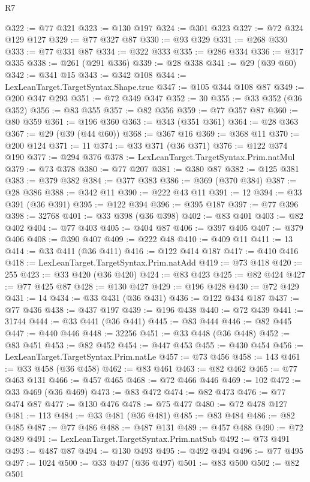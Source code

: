 \begin{lexlean}{R7}
\begin{coremodule}
@322 := @77 @321
@323 := @130 @197
@324 := @301 @323
@327 := @72 @324 @129 @127
@329 := @77 @327 @87
@330 := @93 @329
@331 := @268 @330
@333 := @77 @331 @87
@334 := @322 @333
@335 := @286 @334
@336 := @317 @335
@338 := @261 (@291 @336)
@339 := @28 @338
@341 := @29 (@39 @60)
@342 := @341 @15
@343 := @342 @108
@344 := LexLeanTarget.TargetSyntax.Shape.true
@347 := @105 @344 @108 @87
@349 := @200 @347 @293
@351 := @72 @349 @347
@352 := 30
@355 := @33 @352 (@36 @352)
@356 := @83 @355
@357 := @82 @356
@359 := @77 @357 @87
@360 := @80 @359
@361 := @196 @360
@363 := @343 (@351 @361)
@364 := @28 @363
@367 := @29 (@39 (@44 @60))
@368 := @367 @16
@369 := @368 @11
@370 := @200 @124
@371 := 11
@374 := @33 @371 (@36 @371)
@376 := @122 @374 @190
@377 := @294 @376
@378 := LexLeanTarget.TargetSyntax.Prim.natMul
@379 := @73 @378
@380 := @77 @207
@381 := @380 @87
@382 := @125 @381
@383 := @379 @382
@384 := @377 @383
@386 := @369 (@370 @384)
@387 := @28 @386
@388 := @342 @11
@390 := @222 @43 @11
@391 := 12
@394 := @33 @391 (@36 @391)
@395 := @122 @394
@396 := @395 @187
@397 := @77 @396
@398 := 32768
@401 := @33 @398 (@36 @398)
@402 := @83 @401
@403 := @82 @402
@404 := @77 @403
@405 := @404 @87
@406 := @397 @405
@407 := @379 @406
@408 := @390 @407
@409 := @222 @48
@410 := @409 @11
@411 := 13
@414 := @33 @411 (@36 @411)
@416 := @122 @414 @187
@417 := @410 @416
@418 := LexLeanTarget.TargetSyntax.Prim.natAdd
@419 := @73 @418
@420 := 255
@423 := @33 @420 (@36 @420)
@424 := @83 @423
@425 := @82 @424
@427 := @77 @425 @87
@428 := @130 @427
@429 := @196 @428
@430 := @72 @429
@431 := 14
@434 := @33 @431 (@36 @431)
@436 := @122 @434 @187
@437 := @77 @436
@438 := @437 @197
@439 := @196 @438
@440 := @72 @439
@441 := 31744
@444 := @33 @441 (@36 @441)
@445 := @83 @444
@446 := @82 @445
@447 := @440 @446
@448 := 32256
@451 := @33 @448 (@36 @448)
@452 := @83 @451
@453 := @82 @452
@454 := @447 @453
@455 := @430 @454
@456 := LexLeanTarget.TargetSyntax.Prim.natLe
@457 := @73 @456
@458 := 143
@461 := @33 @458 (@36 @458)
@462 := @83 @461
@463 := @82 @462
@465 := @77 @463 @131
@466 := @457 @465
@468 := @72 @466 @446
@469 := 102
@472 := @33 @469 (@36 @469)
@473 := @83 @472
@474 := @82 @473
@476 := @77 @474 @87
@477 := @130 @476
@478 := @75 @477
@480 := @72 @478 @127
@481 := 113
@484 := @33 @481 (@36 @481)
@485 := @83 @484
@486 := @82 @485
@487 := @77 @486
@488 := @487 @131
@489 := @457 @488
@490 := @72 @489
@491 := LexLeanTarget.TargetSyntax.Prim.natSub
@492 := @73 @491
@493 := @487 @87
@494 := @130 @493
@495 := @492 @494
@496 := @77 @495
@497 := 1024
@500 := @33 @497 (@36 @497)
@501 := @83 @500
@502 := @82 @501

\end{coremodule}
\end{lexlean}
